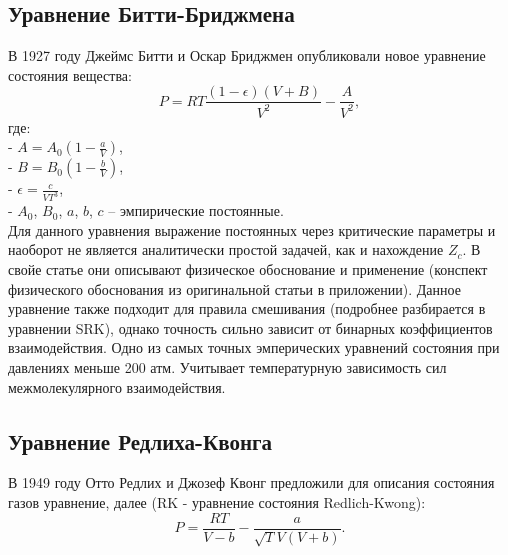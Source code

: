 \documentclass[a4paper]{article}
\numberwithin{equation}{subsection} %
\begin{document}
\subsection{Уравнение Битти-Бриджмена}
В 1927 году Джеймс Битти и Оскар Бриджмен опубликовали новое уравнение состояния вещества:
\begin{equation}
P = RT\frac{(1 - \epsilon)(V + B)}{V^2} - \frac{A}{V^2},
\tag{\thesubsection}
\end{equation}
где:\\
- $A = A_0\left(1 - \frac{a}{V}\right)$,\\
- $B = B_0\left(1 - \frac{b}{V}\right)$,\\
- $\epsilon = \frac{c}{VT^3}$,\\
- $A_0$, $B_0$, $a$, $b$, $c$ -- эмпирические постоянные.\\
Для данного уравнения выражение постоянных через критические параметры и наоборот не является аналитически простой задачей, как и нахождение $Z_c$.
В свойе статье они описывают физическое обоснование и применение (конспект физического обоснования из оригинальной статьи в приложении). Данное уравнение также подходит для правила смешивания (подробнее разбирается в уравнении SRK), однако точность сильно зависит от бинарных коэффициентов взаимодействия. Одно из самых точных эмперических уравнений состояния при давлениях меньше 200 атм. Учитывает температурную зависимость сил межмолекулярного взаимодействия.

\subsection{Уравнение Редлиха-Квонга}
В 1949 году Отто Редлих и Джозеф Квонг предложили для описания состояния газов уравнение, далее (RK - уравнение состояния Redlich-Kwong):
\begin{equation}
      P = \frac{RT}{V-b} - \frac{a}{\sqrt{T}V(V+b)}.
\tag{\thesubsection}
\end{equation}
\end{document}
